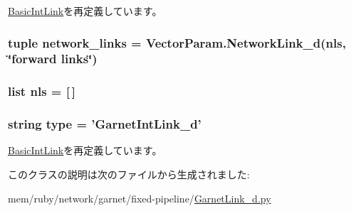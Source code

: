 \hyperlink{classBasicLink_1_1BasicIntLink_a17da7064bc5c518791f0c891eff05fda}{BasicIntLink}を再定義しています。\hypertarget{classGarnetLink__d_1_1GarnetIntLink__d_a8bbf0848b3bec491562615b151d5c318}{
\subsubsection[{network\_\-links}]{\setlength{\rightskip}{0pt plus 5cm}tuple {\bf network\_\-links} = VectorParam.NetworkLink\_\-d({\bf nls}, \char`\"{}forward links\char`\"{})}}
\label{classGarnetLink__d_1_1GarnetIntLink__d_a8bbf0848b3bec491562615b151d5c318}
\hypertarget{classGarnetLink__d_1_1GarnetIntLink__d_af11789bfc44615f3244deb3cf6054da9}{
\subsubsection[{nls}]{\setlength{\rightskip}{0pt plus 5cm}list {\bf nls} = \mbox{[}$\,$\mbox{]}}}
\label{classGarnetLink__d_1_1GarnetIntLink__d_af11789bfc44615f3244deb3cf6054da9}
\hypertarget{classGarnetLink__d_1_1GarnetIntLink__d_acce15679d830831b0bbe8ebc2a60b2ca}{
\subsubsection[{type}]{\setlength{\rightskip}{0pt plus 5cm}string {\bf type} = '{\bf GarnetIntLink\_\-d}'}}
\label{classGarnetLink__d_1_1GarnetIntLink__d_acce15679d830831b0bbe8ebc2a60b2ca}


\hyperlink{classBasicLink_1_1BasicIntLink_acce15679d830831b0bbe8ebc2a60b2ca}{BasicIntLink}を再定義しています。

このクラスの説明は次のファイルから生成されました:\begin{DoxyCompactItemize}
\item 
mem/ruby/network/garnet/fixed-\/pipeline/\hyperlink{GarnetLink__d_8py}{GarnetLink\_\-d.py}\end{DoxyCompactItemize}
